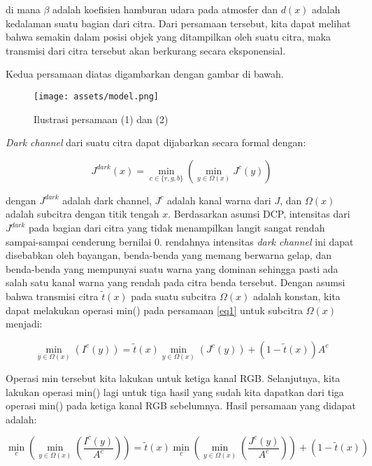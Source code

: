 \documentclass[11pt, a4paper, final]{report}
\begin{document}
di mana $\beta$ adalah koefisien hamburan udara pada atmosfer dan $d(x)$ adalah kedalaman suatu bagian dari citra. Dari persamaan tersebut, kita dapat melihat bahwa semakin dalam posisi objek yang ditampilkan oleh suatu citra, maka transmisi dari citra tersebut akan berkurang secara eksponensial.

\newpage
Kedua persamaan diatas digambarkan dengan gambar di bawah.

\begin{figure}[htbp]
\centering
\texttt{[image: assets/model.png]}
\caption{Ilustrasi persamaan (1) dan (2)}
\end{figure}

\textit{Dark channel} dari suatu citra dapat dijabarkan secara formal dengan:

\begin{equation} \label{eq3}
J^{dark}(x) = \min_{c\in{\{r,g,b\}}}{(\min_{y\in{\Omega(x)}}{J^c(y)})}
\end{equation}

dengan $J^{dark}$ adalah dark channel, $J^{c}$ adalah kanal warna dari $J$, dan $\Omega(x)$ adalah subcitra dengan titik tengah $x$. Berdasarkan asumsi DCP, intensitas dari $J^{dark}$ pada bagian dari citra yang tidak menampilkan langit sangat rendah sampai-sampai cenderung bernilai 0. rendahnya intensitas \textit{dark channel} ini dapat disebabkan oleh bayangan, benda-benda yang memang berwarna gelap, dan benda-benda yang mempunyai suatu warna yang dominan sehingga pasti ada salah satu kanal warna yang rendah pada citra benda tersebut. 
Dengan asumsi bahwa transmisi citra $\tilde{t}(x)$ pada suatu subcitra $\Omega(x)$ adalah konstan, kita dapat melakukan operasi min() pada persamaan \ref{eq1} untuk subcitra $\Omega(x)$ menjadi:

\begin{equation} \label{eq4}
\min_{y\in{\Omega(x)}}{(I^c(y))}=\tilde{t}(x)\min_{y\in{\Omega(x)}}{(J^c(y))}+(1-\tilde{t}(x))A^c
\end{equation}

Operasi min tersebut kita lakukan untuk ketiga kanal RGB. Selanjutnya, kita lakukan operasi min() lagi untuk tiga hasil yang sudah kita dapatkan dari tiga operasi min() pada ketiga kanal RGB sebelumnya. Hasil persamaan yang didapat adalah:

\begin{equation} \label{eq5}
\min_c{(\min_{y\in{\Omega(x)}}{(\dfrac{I^c(y)}{A^c})})}=\tilde{t}(x)\min_c{(\min_{y\in{\Omega(x)}}{(\dfrac{J^c(y)}{A^c})})}+(1-\tilde{t}(x))
\end{equation}
\end{document}
